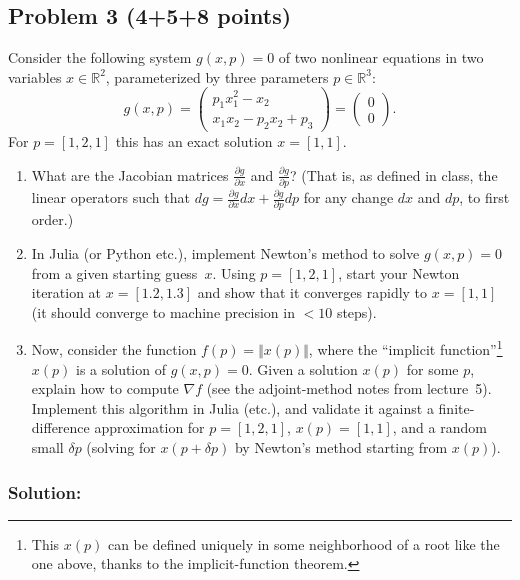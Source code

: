 \documentclass[10pt,oneside]{article}
\begin{document}
\subsection*{Problem 3 (4+5+8 points)}

Consider the following system $g(x,p)=0$ of two nonlinear equations
in two variables $x\in\mathbb{R}^{2}$, parameterized by three parameters
$p\in\mathbb{R}^{3}$:
\[
g(x,p)=\left(\begin{array}{c}
p_{1}x_{1}^{2}-x_{2}\\
x_{1}x_{2}-p_{2}x_{2}+p_{3}
\end{array}\right)=\left(\begin{array}{c}
0\\
0
\end{array}\right).
\]
For $p=[1,2,1]$ this has an exact solution $x=[1,1]$.
\begin{enumerate}
\item What are the Jacobian matrices $\frac{\partial g}{\partial x}$ and
$\frac{\partial g}{\partial p}$? (That is, as defined in class, the
linear operators such that $dg=\frac{\partial g}{\partial x}dx+\frac{\partial g}{\partial p}dp$
for any change $dx$ and $dp$, to first order.)
\item In Julia (or Python etc.), implement Newton's method to solve $g(x,p)=0$
from a given starting guess~$x$. Using $p=[1,2,1]$, start your
Newton iteration at $x=[1.2,1.3]$ and show that it converges rapidly
to $x=[1,1]$ (it should converge to machine precision in $<10$ steps).
\item Now, consider the function $f(p)=\Vert x(p)\Vert$, where the ``implicit
function''\footnote{This $x(p)$ can be defined uniquely in some neighborhood of a root
like the one above, thanks to the implicit-function theorem.} $x(p)$ is a solution of $g(x,p)=0$. Given a solution $x(p)$ for
some $p$, explain how to compute $\nabla f$ (see the adjoint-method
notes from lecture~5). Implement this algorithm in Julia (etc.),
and validate it against a finite-difference approximation for $p=[1,2,1]$,
$x(p)=[1,1]$, and a random small $\delta p$ (solving for $x(p+\delta p)$
by Newton's method starting from $x(p)$).
\end{enumerate}

\subsubsection*{Solution:}
\end{document}
